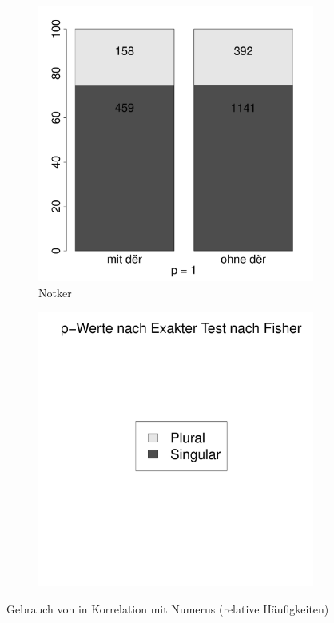 \begin{figure}
\begin{subfigure}[b]{.5\linewidth}
  \includegraphics[height=.25\textheight]{generated/images/numerus-notker}
\caption {Notker}
\end{subfigure}%
\begin{subfigure}[b]{.5\linewidth}
  \includegraphics[height=.25\textheight]{generated/images/numerus-legende}
\end{subfigure}

\caption{Gebrauch von  in Korrelation mit Numerus (relative Häufigkeiten)}
\label{fig:numerus}
\end{figure}


